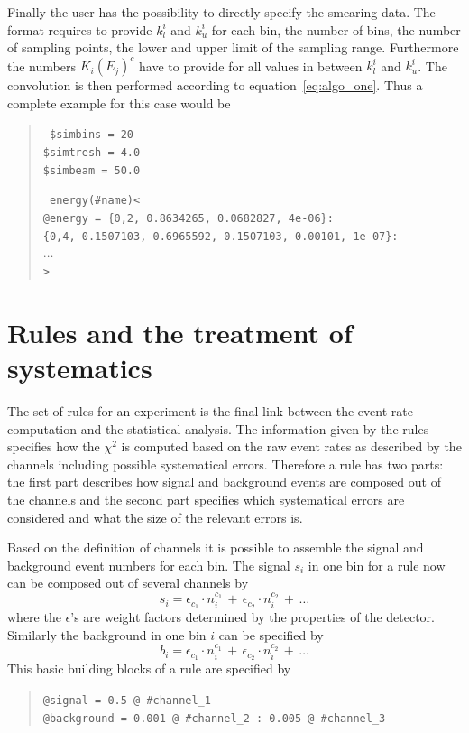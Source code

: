 Finally the user has the possibility to directly specify the smearing data.
The format requires to provide $k_l^i$ and $k_u^i$ for each bin, the number of
bins, the number of sampling points, the lower and upper limit of the sampling
range. Furthermore the numbers $K_i(E_j)^c$ have to provide for all values
in between $k_l^i$ and $k_u^i$. The convolution is then performed according to
equation~\ref{eq:algo_one}. Thus a complete example for this case would be
\begin{quote}
{\tt
\$simbins = 20\\
\$simtresh =          4.0\\
\$simbeam =         50.0\\
}

{\tt 
energy(\#name)<\\
\tb @energy =   \{0,2, 0.8634265, 0.0682827,     4e-06\}:\\
\tb\tb \{0,4, 0.1507103, 0.6965592, 0.1507103,   0.00101,     1e-07\}:\\
\tb\tb $\ldots$\\
>
}
\end{quote}

\section{Rules and the treatment of systematics}
\label{sec:rules}

The set of rules for an experiment is the final 
link between the event rate
computation and the statistical analysis. The information given by the rules
specifies how the $\chi^2$ is computed based on the raw event rates as 
described by the channels including possible systematical errors. 
Therefore a rule has two parts: the first part describes how signal and 
background events are composed out of the channels and the second part
specifies which systematical errors are considered and what the size
of the relevant errors is.

Based on the definition of channels it is possible to assemble the 
signal and background event numbers for each bin.  
The signal $s_i$ in one bin for a rule now can be composed out of 
several channels by
\begin{equation}
s_i=\epsilon_{c_1}\cdot n_i^{c_1}\,+\,\epsilon_{c_2}\cdot n_i^{c_2}\,+\,\ldots
\end{equation}
where the $\epsilon$'s are weight factors determined by the properties
of the detector.
Similarly the background in one bin $i$ can be specified by
\begin{equation}
b_i=\epsilon_{c_1}\cdot n_i^{c_1}\,+\,\epsilon_{c_2}\cdot n_i^{c_2}\,+\,\ldots
\end{equation}
This basic building blocks of a rule are specified by
\begin{quote}
{\tt \tb @signal = 0.5 @ \#channel\_1\\
\tb @background = 0.001 @ \#channel\_2 :  0.005 @ \#channel\_3
}
\end{quote}


